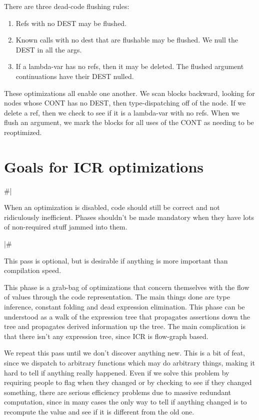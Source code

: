 There are three dead-code flushing rules:

\begin{enumerate}
\item Refs with no DEST may be flushed.

\item Known calls with no dest that are flushable may be flushed.  We null the
DEST in all the args.

\item If a lambda-var has no refs, then it may be deleted. The flushed
    argument continuations have their DEST nulled.
\end{enumerate}

These optimizations all enable one another.  We scan blocks backward, looking
for nodes whose CONT has no DEST, then type-dispatching off of the node.  If we
delete a ref, then we check to see if it is a lambda-var with no refs.  When we
flush an argument, we mark the blocks for all uses of the CONT as needing to be
reoptimized.


\section{Goals for ICR optimizations}

\#|

When an optimization is disabled, code should still be correct and not
ridiculously inefficient.  Phases shouldn't be made mandatory when they have
lots of non-required stuff jammed into them.

|\#

This pass is optional, but is desirable if anything is more important than
compilation speed.

This phase is a grab-bag of optimizations that concern themselves with the flow
of values through the code representation.  The main things done are type
inference, constant folding and dead expression elimination.  This phase can be
understood as a walk of the expression tree that propagates assertions down the
tree and propagates derived information up the tree.  The main complication is
that there isn't any expression tree, since ICR is flow-graph based.

We repeat this pass until we don't discover anything new.  This is a bit of
feat, since we dispatch to arbitrary functions which may do arbitrary things,
making it hard to tell if anything really happened.  Even if we solve this
problem by requiring people to flag when they changed or by checking to see if
they changed something, there are serious efficiency problems due to massive
redundant computation, since in many cases the only way to tell if anything
changed is to recompute the value and see if it is different from the old one.

